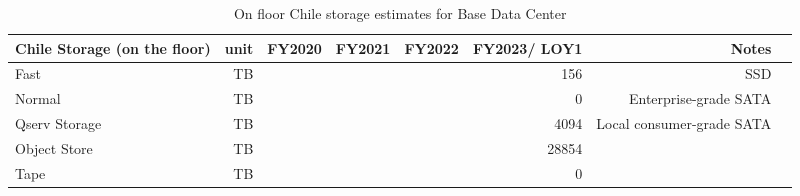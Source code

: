 \tiny \begin{longtable} { |p{}  |r  |r  |r  |r  |r  |r  |r |} 
\caption{On floor Chile storage estimates for Base Data Center \label{tab:chileStorage}}\\ 
\hline 
\textbf{Chile Storage (on the floor)}&\textbf{unit}&\textbf{FY2020}&\textbf{FY2021}&\textbf{FY2022}&\textbf{FY2023/ LOY1}&\textbf{Notes} \\ \hline
{Fast}&{TB}&{}&{}&{}&{156}&{SSD} \\ \hline
{Normal}&{TB}&{}&{}&{}&{0}&{Enterprise-grade SATA} \\ \hline
{Qserv Storage}&{TB}&{}&{}&{}&{4094}&{Local consumer-grade SATA} \\ \hline
{Object Store}&{TB}&{}&{}&{}&{28854}& \\ \hline
{Tape}&{TB}&{}&{}&{}&{0}& \\ \hline
\end{longtable} \normalsize

